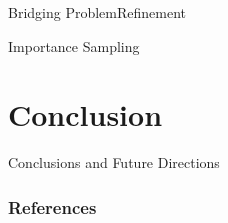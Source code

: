 \documentclass{beamer}
\begin{document}
\begin{frame}{Bridging Problem}{Refinement}
\end{frame}

\begin{frame}{Importance Sampling}
    
\end{frame}

\section{Conclusion}
\begin{frame}{Conclusions and Future Directions}
\end{frame}

\begin{frame}[allowframebreaks]
    \frametitle{References}
%        
    \printbibliography
\end{frame}

\end{document}
